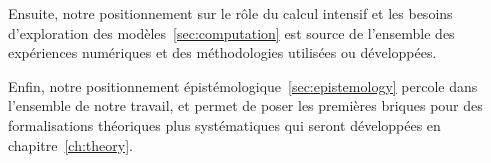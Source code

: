 Ensuite, notre positionnement sur le rôle du calcul intensif et les besoins d'exploration des modèles~\ref{sec:computation} est source de l'ensemble des expériences numériques et des méthodologies utilisées ou développées.


Enfin, notre positionnement épistémologique~\ref{sec:epistemology} percole dans l'ensemble de notre travail, et permet de poser les premières briques pour des formalisations théoriques plus systématiques qui seront développées en chapitre~\ref{ch:theory}.


